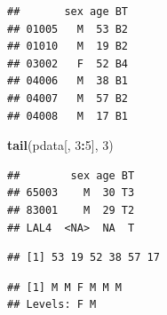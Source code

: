 \documentclass[]{article}
\newenvironment{Shaded}{\begin{snugshade}}{\end{snugshade}}
\newcommand{\KeywordTok}[1]{\textcolor[rgb]{0.13,0.29,0.53}{\textbf{#1}}}
\newcommand{\DecValTok}[1]{\textcolor[rgb]{0.00,0.00,0.81}{#1}}
\newcommand{\StringTok}[1]{\textcolor[rgb]{0.31,0.60,0.02}{#1}}
\newcommand{\OperatorTok}[1]{\textcolor[rgb]{0.81,0.36,0.00}{\textbf{#1}}}
\newcommand{\NormalTok}[1]{#1}
\theoremstyle{definition}
\theoremstyle{definition}
\theoremstyle{remark}
\begin{document}
\begin{verbatim}
##       sex age BT
## 01005   M  53 B2
## 01010   M  19 B2
## 03002   F  52 B4
## 04006   M  38 B1
## 04007   M  57 B2
## 04008   M  17 B1
\end{verbatim}

\begin{Shaded}
\begin{Highlighting}[]
\KeywordTok{tail}\NormalTok{(pdata[, }\DecValTok{3}\OperatorTok{:}\DecValTok{5}\NormalTok{], }\DecValTok{3}\NormalTok{)}
\end{Highlighting}
\end{Shaded}

\begin{verbatim}
##        sex age BT
## 65003    M  30 T3
## 83001    M  29 T2
## LAL4  <NA>  NA  T
\end{verbatim}

\begin{Shaded}
\end{Shaded}

\begin{verbatim}
## [1] 53 19 52 38 57 17
\end{verbatim}

\begin{Shaded}
\end{Shaded}

\begin{verbatim}
## [1] M M F M M M
## Levels: F M
\end{verbatim}

\begin{Shaded}
\end{Shaded}
\end{document}
